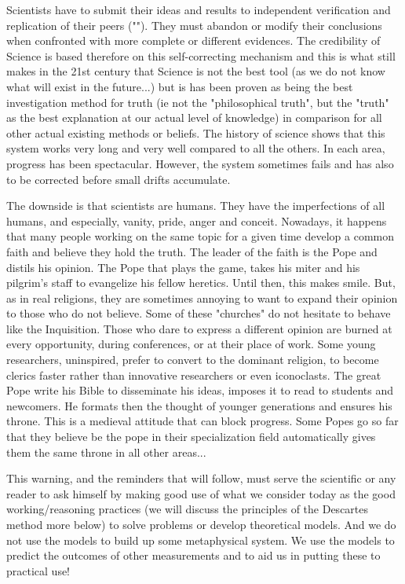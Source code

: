 	Scientists have to submit their ideas and results to independent verification and replication of their peers (""). They must abandon or modify their conclusions when confronted with more complete or different evidences. The credibility of Science is based therefore on this self-correcting mechanism and this is what still makes in the 21st century that Science is not the best tool (as we do not know what will exist in the future...) but is has been proven as being the best investigation method for truth (ie not the "philosophical truth", but the "truth" as the best explanation at our actual level of knowledge) in comparison for all other actual existing methods or beliefs. The history of science shows that this system works very long and very well compared to all the others. In each area, progress has been spectacular. However, the system sometimes fails and has also to be corrected before small drifts accumulate.

	The downside is that scientists are humans. They have the imperfections of all humans, and especially, vanity, pride, anger and conceit. Nowadays, it happens that many people working on the same topic for a given time develop a common faith and believe they hold the truth. The leader of the faith is the Pope and distils his opinion. The Pope that plays the game, takes his miter and his pilgrim's staff to evangelize his fellow heretics. Until then, this makes smile. But, as in real religions, they are sometimes annoying to want to expand their opinion to those who do not believe. Some of these "churches" do not hesitate to behave like the Inquisition. Those who dare to express a different opinion are burned at every opportunity, during conferences, or at their place of work. Some young researchers, uninspired, prefer to convert to the dominant religion, to become clerics faster rather than innovative researchers or even iconoclasts. The great Pope write his Bible to disseminate his ideas, imposes it to read to students and newcomers. He formats then the thought of younger generations and ensures his throne. This is a medieval attitude that can block progress. Some Popes go so far that they believe be the pope in their specialization field automatically gives them the same throne in all other areas...

	This warning, and the reminders that will follow, must serve the scientific or any reader to ask himself by making good use of what we consider today as the good working/reasoning practices (we will discuss the principles of the Descartes method more below) to solve problems or develop theoretical models. And we do not use the models to build up some metaphysical system. We use the models to predict the outcomes of other measurements and to aid us in putting these to practical use!

